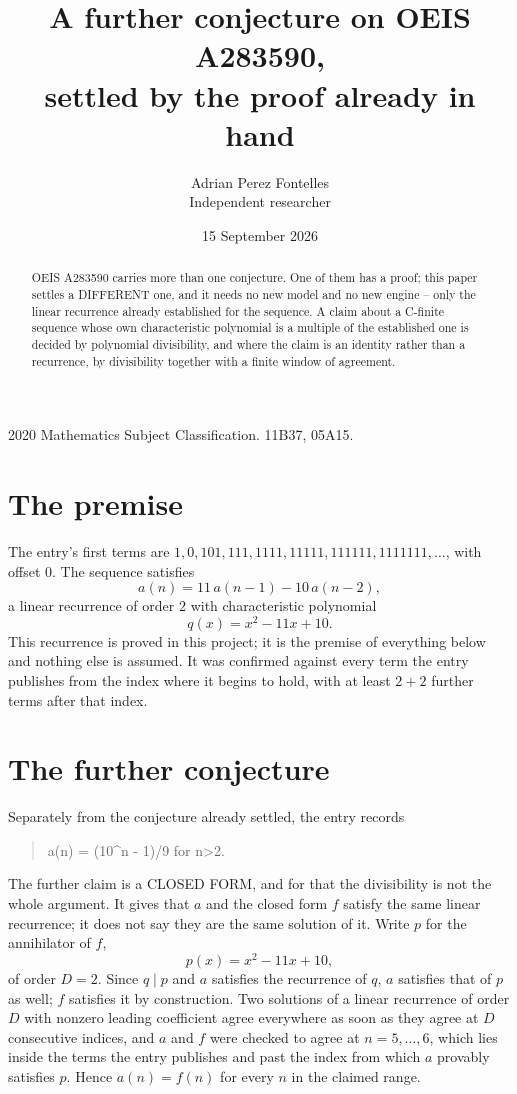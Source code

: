 \documentclass[11pt,a4paper]{article}
\title{A further conjecture on OEIS A283590,\\ \large settled by the proof already in hand}
\author{Adrian Perez Fontelles\\ \small Independent researcher}
\date{15 September 2026}
\theoremstyle{plain}
\theoremstyle{definition}
\begin{document}
\maketitle

\begin{abstract}
OEIS A283590 carries more than one conjecture. One of them has a proof; this paper settles a
DIFFERENT one, and it needs no new model and no new engine -- only the linear recurrence already
established for the sequence. A claim about a C-finite sequence whose own characteristic
polynomial is a multiple of the established one is decided by polynomial divisibility, and where
the claim is an identity rather than a recurrence, by divisibility together with a finite window
of agreement.
\end{abstract}

\noindent\small 2020 Mathematics Subject Classification. 11B37, 05A15.\normalsize

\section{The premise}

The entry's first terms are $1, 0, 101, 111, 1111, 11111, 111111, 1111111,\dots$, with offset $0$. The sequence satisfies
\[
  a(n)=11\,a(n-1) - 10\,a(n-2) ,
\]
a linear recurrence of order $2$ with characteristic polynomial
\[
  q(x)=x^{2} - 11 x + 10 .
\]
This recurrence is proved in this project; it is the premise of everything below and nothing else is assumed.
It was confirmed against every term the entry publishes from the index where it begins to hold,
with at least $2+2$ further terms after that index.

\section{The further conjecture}

Separately from the conjecture already settled, the entry records

\begin{quote}\raggedright a(n) = (10\^{}n - 1)/9 for n>2.\end{quote}

The further claim is a CLOSED FORM, and for that the divisibility is not the whole argument. It
gives that $a$ and the closed form $f$ satisfy the same linear recurrence; it does not say they
are the same solution of it. Write $p$ for the annihilator of $f$,
\[
  p(x)=x^{2} - 11 x + 10 ,
\]
of order $D=2$. Since $q\mid p$ and $a$ satisfies the recurrence of $q$, $a$ satisfies that of
$p$ as well; $f$ satisfies it by construction. Two solutions of a linear recurrence of order $D$
with nonzero leading coefficient agree everywhere as soon as they agree at $D$ consecutive
indices, and $a$ and $f$ were checked to agree at $n=5,\dots,6$,
which lies inside the terms the entry publishes and past the index from which $a$ provably
satisfies $p$. Hence $a(n)=f(n)$ for every $n$ in the claimed range.
\end{document}
